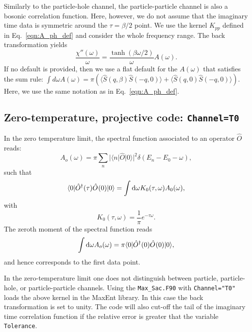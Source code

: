 Similarly to the particle-hole channel, the particle-particle channel is also a bosonic correlation function. Here, however, we do not assume that the  imaginary time data is symmetric around   the $\tau = \beta/2$ point.  We use the kernel $K_{pp}$ 
defined in Eq.~\eqref{eqn:A_ph_def}  and consider the whole frequency range. 
The back transformation  yields
\begin{equation}
 \frac{\chi''(\omega)} {\omega}   = \frac{\tanh \left( \beta \omega/2 \right) }{ \omega }   A(\omega) .
\end{equation}
If no default is provided, then we use a flat default for the $A(\omega)$ that satisfies the sum rule: $ \int d \omega A(\omega) =  \pi  \left(\langle \hat{S}(q,\beta) \hat{S}(-q,0) \rangle  +
\langle \hat{S}(q,0) \hat{S}(-q,0) \rangle \right) $. Here, we use the same notation as in Eq.~\eqref{eqn:A_ph_def}.


\subsection{Zero-temperature, projective code:  \texttt{Channel=T0}}

 In the zero temperature limit,  the spectral function associated to an operator $\hat{O} $    reads:
 \begin{equation}
 	  A_o(\omega)    = \pi  \sum_{n}    | \langle n  | \hat{O} | 0 \rangle |^2 \delta( E_n - E_0 - \omega) ,
 \end{equation}
 such that 
 \begin{equation}
 	\langle 0 | \hat{O}^{\dagger}(\tau) \hat{O}^{}(0) | 0 \rangle =  \int \mathrm{d}\omega  K_0(\tau,\omega) A_0(\omega) ,
 \end{equation}
 with 
 \begin{equation}
 	K_0(\tau,\omega)  = \frac{1}{\pi}e^{-\tau \omega}.
 \end{equation}
 The zeroth moment of the spectral function reads
 \begin{equation}
  \int \mathrm{d} \omega A_o(\omega) = \pi \langle 0 | \hat{O}^{\dagger}(0) \hat{O}^{}(0) | 0 \rangle, 
 \end{equation}
 and hence corresponds to the first data point.
 
 In the zero-temperature limit one does not distinguish between  particle, particle-hole, or particle-particle channels.
 Using the \texttt{Max\_Sac.F90}  with \texttt{Channel="T0"} loads the above kernel in the MaxEnt library. In this case the back  transformation is set to unity. 
 The code will also cut-off the tail of the  imaginary time correlation function  if the relative error is greater that the variable \texttt{Tolerance}. 
 
